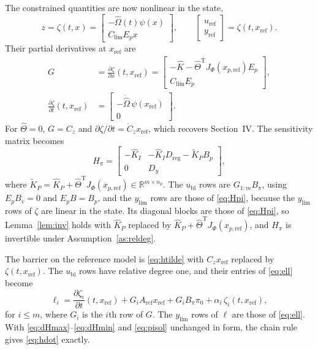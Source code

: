 \documentclass[lettersize,journal]{IEEEtran}
\newcommand{\Kh}{\hat{K}}
\newcommand{\xr}{x_{\mathrm{ref}}}
\newcommand{\xpr}{x_{p,\mathrm{ref}}}
\newcommand{\Ar}{A_{\mathrm{ref}}}
\newcommand{\ub}{u_{\mathrm{bl}}}
\newcommand{\uref}{u_{\mathrm{ref}}}
\newcommand{\yref}{y_{\mathrm{ref}}}
\newcommand{\Clim}{C_{\mathrm{lim}}}
\newcommand{\ylim}{y_{\mathrm{lim}}}
\newcommand{\Dreg}{D_{\mathrm{reg}}}
\newcommand{\T}{\mathrm{T}}
\newcommand{\R}{\mathbb{R}}
\begin{document}
The constrained quantities are now nonlinear in the state,
\begin{equation}
z=\zeta(t,x)=\begin{bmatrix}-\hat\Omega(t)\psi(x)\\ \Clim E_px\end{bmatrix},\qquad
\begin{bmatrix}\uref\\ \yref\end{bmatrix}=\zeta(t,\xr). \label{eq:zeta}
\end{equation}
Their partial derivatives at $\xr$ are
\begin{align}
G &= \frac{\partial\zeta}{\partial x}(t,\xr) = \begin{bmatrix}-\Kh-\hat\Theta^\T J_\Phi(\xpr)E_p\\ \Clim E_p\end{bmatrix}, \label{eq:G}\\
\frac{\partial\zeta}{\partial t}(t,\xr) &= \begin{bmatrix}-\dot{\hat\Omega}\,\psi(\xr)\\ 0\end{bmatrix}. \label{eq:zetat}
\end{align}
For $\hat\Theta=0$, $G=C_z$ and $\partial\zeta/\partial t=\dot C_z\xr$, which recovers Section~IV. The sensitivity matrix becomes
\begin{equation}
H_\pi = \begin{bmatrix}-\Kh_I & -\Kh_I\Dreg-\tilde K_P B_p\\ 0 & D_y\end{bmatrix}, \label{eq:nlHpi}
\end{equation}
where $\tilde K_P=\Kh_P+\hat\Theta^\T J_\Phi(\xpr)\in\R^{m\times n_p}$. The $\ub$ rows are $G_{1:m}B_\pi$, using $E_pB_v=0$ and $E_pB=B_p$, and the $\ylim$ rows are those of \eqref{eq:Hpi}, because the $\ylim$ rows of $\zeta$ are linear in the state. Its diagonal blocks are those of \eqref{eq:Hpi}, so Lemma~\ref{lem:inv} holds with $\Kh_P$ replaced by $\Kh_P+\hat\Theta^\T J_\Phi(\xpr)$, and $H_\pi$ is invertible under Assumption~\ref{as:reldeg}.

The barrier on the reference model is \eqref{eq:htilde} with $C_z\xr$ replaced by $\zeta(t,\xr)$. The $\ub$ rows have relative degree one, and their entries of \eqref{eq:ell} become
\begin{equation}
\ell_i = \frac{\partial\zeta_i}{\partial t}(t,\xr) + G_i\Ar\xr + G_iB_\pi\pi_0 + \alpha_i\,\zeta_i(t,\xr), \label{eq:nlell}
\end{equation}
for $i\le m$, where $G_i$ is the $i$th row of $G$. The $\ylim$ rows of $\ell$ are those of \eqref{eq:ell}. With \eqref{eq:dHmax}--\eqref{eq:dHmin} and \eqref{eq:pisol} unchanged in form, the chain rule gives \eqref{eq:hdot} exactly.
\end{document}
